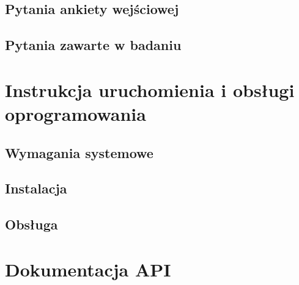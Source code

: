 \documentclass{./assets/wfis}
\begin{document}
\section{Pytania ankiety wejściowej}
\section{Pytania zawarte w badaniu}
\chapter{Instrukcja uruchomienia i obsługi oprogramowania}
\section{Wymagania systemowe}
\section{Instalacja}
\section{Obsługa}
\chapter{Dokumentacja API}

\printbibliography

\clearpage
\listoffigures
\clearpage
\listoftables
\clearpage
\end{document}
